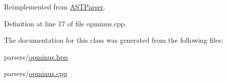 Reimplemented from \hyperlink{class_a_s_t_parser_ab514c1a1b88592974cb6c2f94f482127}{A\+S\+T\+Parser}.



Definition at line 17 of file opminus.\+cpp.



The documentation for this class was generated from the following files\+:\begin{DoxyCompactItemize}
\item 
parsers/\hyperlink{opminus_8hpp}{opminus.\+hpp}\item 
parsers/\hyperlink{opminus_8cpp}{opminus.\+cpp}\end{DoxyCompactItemize}
